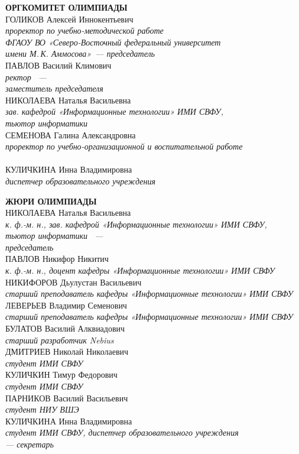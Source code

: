 \newpage
\noindent
\textbf{ОРГКОМИТЕТ ОЛИМПИАДЫ}
\\[2mm]
ГОЛИКОВ Алексей Иннокентьевич\\ 
\textit{проректор по учебно-методической работе \\ 
ФГАОУ ВО «Северо-Восточный федеральный университет \\
\textit{имени М.\,К. Аммосова»~--- председатель}}
\\[2mm]
ПАВЛОВ Василий Климович \\
\textit{ректор \man~--- \\
заместитель председателя}
\\[2mm]
НИКОЛАЕВА Наталья Васильевна \\
\textit{зав. кафедрой «Информационные технологии» ИМИ СВФУ, \\
тьютор информатики \man}
\\[2mm]
СЕМЕНОВА Галина Александровна \\
\textit{проректор по учебно-организационной и воспитательной работе \\
\man}
\\[2mm]
КУЛИЧКИНА Инна Владимировна \\
\textit{диспетчер образовательного учреждения \\
\man}

\newpage
\noindent
\textbf{ЖЮРИ ОЛИМПИАДЫ}
\\[2mm]
НИКОЛАЕВА Наталья Васильевна \\
\textit{к. ф.-м. н., зав. кафедрой «Информационные технологии» ИМИ СВФУ, \\
тьютор информатики \man~--- \\
председатель}
\\[2mm]
ПАВЛОВ Никифор Никитич \\
\textit{к. ф.-м. н., доцент кафедры «Информационные технологии» ИМИ СВФУ}
\\[2mm]
НИКИФОРОВ Дьулустан Васильевич \\
\textit{старший преподаватель кафедры «Информационные технологии» ИМИ СВФУ}
\\[2mm]
ЛЕВЕРЬЕВ Владимир Семенович \\
\textit{старший преподаватель кафедры «Информационные технологии» ИМИ СВФУ}
\\[2mm]
БУЛАТОВ Василий Алквиадович \\
\textit{старший разработчик Nebius}
\\[2mm]
ДМИТРИЕВ Николай Николаевич \\
\textit{студент ИМИ СВФУ}
\\[2mm]
КУЛИЧКИН Тимур Федорович \\
\textit{студент ИМИ СВФУ}
\\[2mm]
ПАРНИКОВ Василий Васильевич \\
\textit{студент НИУ ВШЭ}
\\[2mm]
КУЛИЧКИНА Инна Владимировна \\
\textit{студент ИМИ СВФУ, диспетчер образовательного учреждения \\
\man --- секретарь}
